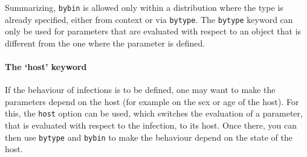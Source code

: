 \documentclass[11pt]{article}
\begin{document}
Summarizing, \texttt{bybin} is allowed only within a distribution where
the type is already specified, either from context or via \texttt{bytype}.
The \texttt{bytype} keyword can only be used for parameters
that are evaluated with respect to an object that is different from the one
where the parameter is defined.

\paragraph{The `host' keyword}

If the behaviour of infections is to be defined, one may want to make the
parameters depend on the host (for example on the sex or age of the host). For
this, the \texttt{host} option can be used, which switches the evaluation of a
parameter, that is evaluated with respect to the infection, to its host. Once
there, you can then use \texttt{bytype} and \texttt{bybin} to make the behaviour
depend on the state of the host.
\end{document}

